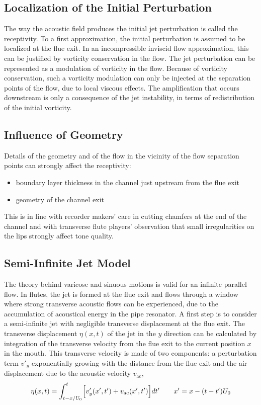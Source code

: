 \subsection{Localization of the Initial Perturbation}

The way the acoustic field produces the initial jet perturbation is called the receptivity. To a first approximation, the initial perturbation is assumed to be localized at the flue exit. In an incompressible inviscid flow approximation, this can be justified by vorticity conservation in the flow. The jet perturbation can be represented as a modulation of vorticity in the flow. Because of vorticity conservation, such a vorticity modulation can only be injected at the separation points of the flow, due to local viscous effects. The amplification that occurs downstream is only a consequence of the jet instability, in terms of redistribution of the initial vorticity.

\subsection{Influence of Geometry}

Details of the geometry and of the flow in the vicinity of the flow separation points can strongly affect the receptivity:

\begin{itemize}
    \item boundary layer thickness in the channel just upstream from the flue exit
    \item geometry of the channel exit
\end{itemize}

This is in line with recorder makers’ care in cutting chamfers at the end of the channel and with transverse flute players’ observation that small irregularities on the lips strongly affect tone quality.

\subsection{Semi-Infinite Jet Model}

The theory behind varicose and sinuous motions is valid for an infinite parallel flow. In flutes, the jet is formed at the flue exit and flows through a window where strong transverse acoustic flows can be experienced, due to the accumulation of acoustical energy in the pipe resonator. A first step is to consider a semi-infinite jet with negligible transverse displacement at the flue exit. The transverse displacement \( \eta(x,t) \) of the jet in the \(y\) direction can be calculated by integration of the transverse velocity from the flue exit to the current position \(x\) in the mouth. This transverse velocity is made of two components: a perturbation term \(v'_y\) exponentially growing with the distance from the flue exit and the air displacement due to the acoustic velocity \(v_{\mathrm{ac}}\),
\[
\eta(x,t)=\int_{t-x/U_0}^{t}\Bigl[v'_y(x',t')+v_{\mathrm{ac}}(x',t')\Bigr]dt'
\qquad
x' = x - (t-t')U_0
\]


